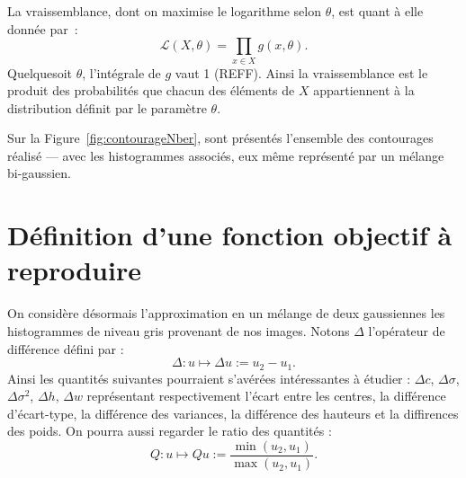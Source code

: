 \documentclass[main.tex]{subfiles}
\begin{document}
La vraissemblance, dont on maximise le logarithme selon $\theta$, est quant à elle donnée par~:
\begin{equation}
\mathcal{L}(X,\theta) = \prod_{x \in X} g(x,\theta).
\end{equation}
Quelquesoit $\theta$, l'intégrale de $g$ vaut 1 (\cf REFF).
Ainsi la vraissemblance est le produit des probabilités que chacun des éléments de $X$ appartiennent à la distribution définit par le paramètre $\theta$.


Sur la Figure~\ref{fig:contourageNber}, sont présentés l'ensemble des contourages réalisé --- avec les histogrammes associés, eux même représenté par un mélange bi-gaussien.


\section{Définition d'une fonction objectif à reproduire}
On considère désormais l'approximation en un mélange de deux gaussiennes les histogrammes de niveau gris provenant de nos images. 
Notons $\Delta$ l'opérateur de différence défini par :
\begin{equation}
\label{eq:operateur_delta_gaussienne}
\Delta :  u \longmapsto \Delta u := u_2 - u_1.
\end{equation}
Ainsi les quantités suivantes pourraient s'avérées intéressantes à étudier : $\Delta c$, $\Delta \sigma$,  $\Delta \sigma^2$, $\Delta h$, $\Delta w$ représentant respectivement l'écart entre les centres, la différence d'écart-type, la différence des variances, la différence des hauteurs et la diffirences des poids. On pourra aussi regarder le ratio des quantités :
\begin{equation}
\label{eq:operateur_quotient_gaussienne}
Q :  u \longmapsto Qu := \dfrac{ \min( u_2 , u_1) }{ \max( u_2 , u_1)  }.
\end{equation}
\end{document}
